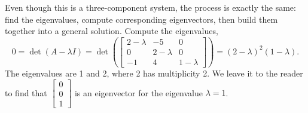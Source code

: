 \documentclass{ximera}
\begin{document}
\begin{exampleSol}
    Even though this is a three-component system, the process is exactly the same: find the eigenvalues, compute corresponding eigenvectors, then build them together into a general solution. Compute the eigenvalues,
    \begin{equation*}
        0 = \det(A-\lambda I) = \det\left(
        \begin{bmatrix}
            2-\lambda & -5 & 0 \\
            0 & 2-\lambda & 0 \\
            -1 & 4 & 1-\lambda
        \end{bmatrix}
        \right) = (2-\lambda)^2(1-\lambda) .
    \end{equation*}
    The eigenvalues are 1 and 2, where 2 has multiplicity 2. We leave it to the reader to find that $\left[ \begin{smallmatrix} 0 \\ 0 \\ 1 \end{smallmatrix} \right]$ is an eigenvector for the eigenvalue $\lambda = 1$.
    

\end{exampleSol}
\end{document}
